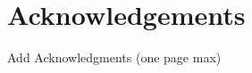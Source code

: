 \setlength{\parindent}{15pt}
\setlength{\parskip}{0em}

\chapter*{Acknowledgements}
\vspace{-15mm}
Add Acknowledgments (one page max)

\setlength{\parskip}{1em}
